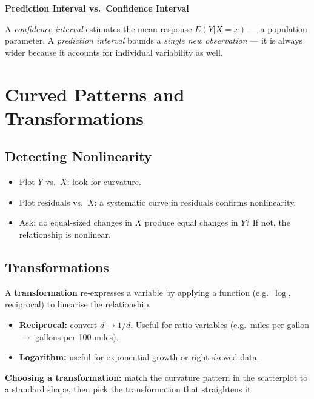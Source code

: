 \documentclass[12pt, a4paper]{article}
\begin{document}
\begin{keybox}
\noindent\textbf{Prediction Interval vs.\ Confidence Interval}\par\smallskip
A \emph{confidence interval} estimates the mean response $E(Y|X=x)$ — a population parameter.
A \emph{prediction interval} bounds a \emph{single new observation} — it is always wider because it accounts for individual variability as well.
\end{keybox}

\section{Curved Patterns and Transformations}

\subsection{Detecting Nonlinearity}

\begin{itemize}
  \item Plot $Y$ vs.\ $X$: look for curvature.
  \item Plot residuals vs.\ $X$: a systematic curve in residuals confirms nonlinearity.
  \item Ask: do equal-sized changes in $X$ produce equal changes in $Y$? If not, the relationship is nonlinear.
\end{itemize}

\subsection{Transformations}

A \textbf{transformation} re-expresses a variable by applying a function (e.g.\ $\log$, reciprocal) to linearise the relationship.

\begin{itemize}
  \item \textbf{Reciprocal:} convert $d \to 1/d$. Useful for ratio variables (e.g.\ miles per gallon $\to$ gallons per 100 miles).
  \item \textbf{Logarithm:} useful for exponential growth or right-skewed data.
\end{itemize}

\textbf{Choosing a transformation:} match the curvature pattern in the scatterplot to a standard shape, then pick the transformation that straightens it.
\end{document}
